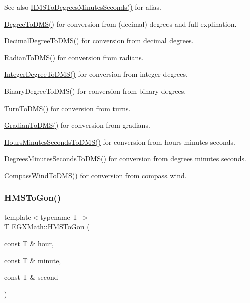 \begin{DoxySeeAlso}{See also}
\mbox{\hyperlink{group___e_g_x_math-_angle_conversions-_h_m_s_ga7f694aec9b3e7cc9d94d510e27e4403f}{H\+M\+S\+To\+Degrees\+Minutes\+Seconds()}} for alias. 

\mbox{\hyperlink{group___e_g_x_math-_angle_conversions-_degree_ga1096d04647918e20f61fb184ba2a7dce}{Degree\+To\+D\+M\+S()}} for conversion from (decimal) degrees and full explination. 

\mbox{\hyperlink{group___e_g_x_math-_angle_conversions-_decimal_degree_ga64a1b298ce16e9edf3209b678a7bed46}{Decimal\+Degree\+To\+D\+M\+S()}} for conversion from decimal degrees. 

\mbox{\hyperlink{group___e_g_x_math-_angle_conversions-_radian_gaf80be0c5c65ccaa5544a08a7754f3575}{Radian\+To\+D\+M\+S()}} for conversion from radians. 

\mbox{\hyperlink{group___e_g_x_math-_angle_conversions-_integer_degree_gaf76779bcc23268b41d4c3a7610d60eaf}{Integer\+Degree\+To\+D\+M\+S()}} for conversion from integer degrees. 

Binary\+Degree\+To\+D\+M\+S() for conversion from binary degrees. 

\mbox{\hyperlink{group___e_g_x_math-_angle_conversions-_turn_ga6ca011c0ae55ae079402080d7a1b4010}{Turn\+To\+D\+M\+S()}} for conversion from turns. 

\mbox{\hyperlink{group___e_g_x_math-_angle_conversions-_gradian_ga0b6700b55ab4a24fa581bf2af0dafdaa}{Gradian\+To\+D\+M\+S()}} for conversion from gradians. 

\mbox{\hyperlink{group___e_g_x_math-_angle_conversions-_hours_minutes_seconds_ga8fe72f56eebb44d7e8d7033476bbdd9b}{Hours\+Minutes\+Seconds\+To\+D\+M\+S()}} for conversion from hours minutes seconds. 

\mbox{\hyperlink{group___e_g_x_math-_angle_conversions-_degrees_minutes_seconds_gae6652ea4b358b3f35f6b7c18faffabb2}{Degrees\+Minutes\+Seconds\+To\+D\+M\+S()}} for conversion from degrees minutes seconds. 

Compass\+Wind\+To\+D\+M\+S() for conversion from compass wind. 
\end{DoxySeeAlso}
\mbox{\label{group___e_g_x_math-_angle_conversions-_h_m_s_ga7751b1ea9b1874096023286240a91068}} 
\subsubsection{\texorpdfstring{H\+M\+S\+To\+Gon()}{HMSToGon()}}
{\footnotesize\ttfamily template$<$typename T $>$ \\
T E\+G\+X\+Math\+::\+H\+M\+S\+To\+Gon (\begin{DoxyParamCaption}\item[{const T \&}]{hour,  }\item[{const T \&}]{minute,  }\item[{const T \&}]{second }\end{DoxyParamCaption})}




